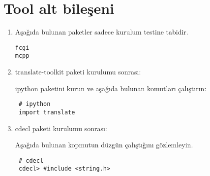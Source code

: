 \documentclass[a4paper,10pt]{article}
\begin{document}
\section{Tool alt bileşeni}
\begin{enumerate}
 \item Aşağıda bulunan paketler sadece kurulum testine tabidir.
\begin{verbatim}
fcgi
mcpp
\end{verbatim}
\item translate-toolkit paketi kurulumu sonrası:

ipython paketini kurun ve aşağıda bulunan komutları çalıştırın:
\begin{verbatim}
 # ipython
 import translate
\end{verbatim}

\item cdecl paketi kurulumu sonrası:

Aşağıda bulunan kopmutun düzgün çalıştığını gözlemleyin.
\begin{verbatim}
 # cdecl
 cdecl> #include <string.h>
\end{verbatim}

\end{enumerate}
\end{document}
